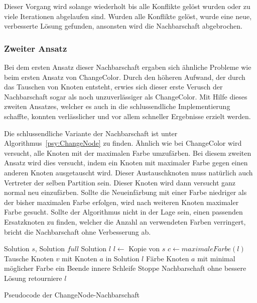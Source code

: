 Dieser Vorgang wird solange wiederholt bis alle Konflikte gelöst wurden oder zu viele Iterationen abgelaufen sind. Wurden alle Konflikte gelöst, wurde eine neue, verbesserte Lösung gefunden, ansonsten wird die Nachbarschaft abgebrochen.

\subsubsection{Zweiter Ansatz}

Bei dem ersten Ansatz dieser Nachbarschaft ergaben sich ähnliche Probleme wie beim ersten Ansatz von ChangeColor. Durch den höheren Aufwand, der durch das Tauschen von Knoten entsteht, erwies sich dieser erste Verusch der Nachbarschaft
sogar als noch unzuverlässiger als ChangeColor. Mit Hilfe dieses zweiten Ansatzes, welcher es auch in die schlussendliche Implementierung schaffte, konnten verlässlicher und vor allem schneller Ergebnisse erzielt werden.

Die schlussendliche Variante der Nachbarschaft ist unter Algorithmus~\ref{psy:ChangeNode} zu finden. Ähnlich wie bei ChangeColor wird versucht, alle Knoten mit der maximalen Farbe umzufärben. Bei diesem zweiten Ansatz wird dies versucht, indem
ein Knoten mit maximaler Farbe gegen einen anderen Knoten ausgetauscht wird. Dieser Austauschknoten muss natürlich auch Vertreter der selben Partition sein. Dieser Knoten wird dann versucht ganz normal
neu einzufärben. Sollte die Neueinfärbung mit einer Farbe niedriger als der bisher maximalen Farbe erfolgen, wird nach weiteren Knoten maximaler Farbe gesucht. Sollte der Algorithmus nicht in der Lage sein, einen
passenden Ersatzknoten zu finden, welcher die Anzahl an verwendeten Farben verringert, bricht die Nachbarschaft ohne Verbesserung ab.

\begin{algorithm}
\begin{algorithmic}[1]
\Require Solution $s$, Solution $full$
\Ensure Solution $l$
\State $l \leftarrow$ Kopie von $s$
\State $c \leftarrow maximaleFarbe(l)$
\State Tausche Knoten $v$ mit Knoten $a$ in Solution $l$
\State Färbe Knoten $a$ mit minimal möglicher Farbe ein
\State Beende innere Schleife
\EndIf
\EndFor
{}
\State Stoppe Nachbarschaft ohne bessere Lösung
\EndIf
\EndFor
\State retourniere $l$
\end{algorithmic}
\caption{Pseudocode der ChangeNode-Nachbarschaft}
\label{psy:ChangeNode}
\end{algorithm}

